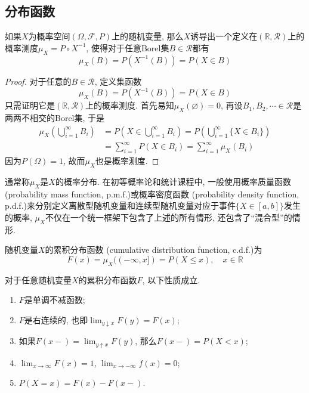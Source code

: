 \documentclass[cn, 12pt, math=mtpro2, bibstyle=apa, blue, twocol]{elegantbook}
\newcommand{\F}{\mathcal{F}}
\newcommand{\R}{\mathbb{R}}
\newcommand{\PP}{P}
\let\emptyset\varnothing
\begin{document}
\subsection{分布函数}
\begin{theorem}
  如果$X$为概率空间$(\Omega,\F,\PP)$上的随机变量, 那么$X$诱导出一个定义在$(\R,\mathcal{R})$上的概率测度$\mu_X=\PP\circ X^{-1}$, 使得对于任意Borel集$B\in\mathcal{R}$都有
  $$\mu_X(B)=\PP(X^ {-1}(B))=\PP(X\in B)$$
\end{theorem}
\begin{proof}
  对于任意的$B\in\mathcal{R}$, 定义集函数
  $$\mu_X(B)=\PP(X^{-1}(B))=\PP(X\in B)$$
  只需证明它是$(\R,\mathcal{R})$上的概率测度. 首先易知$\mu_X(\emptyset)=0$, 再设$B_1,B_2,\cdots\in\mathcal{R}$是两两不相交的Borel集, 于是
  \begin{align*}
  \mu_X\left(\bigcup_{i=1}^\infty B_i \right)&=\PP\left(X\in\bigcup_{i=1}^\infty B_i\right)=\PP\left(\bigcup_{i=1}^\infty\{X\in B_i\}\right) \\
  &=\sum_{i=1}^{\infty}\PP(X\in B_i)=\sum_{i=1}^{\infty}\mu_X(B_i)
  \end{align*}
  因为$\PP(\Omega)=1$, 故而$\mu_X$也是概率测度.
\end{proof}
通常称$\mu_X$是$X$的概率分布. 在初等概率论和统计课程中, 一般使用概率质量函数 (probability mass function, p.m.f.)或概率密度函数 (probability density function, p.d.f.)来分别定义离散型随机变量和连续型随机变量对应于事件$\{X\in[a,b]\}$发生的概率, $\mu_X$不仅在一个统一框架下包含了上述的所有情形, 还包含了“混合型”的情形.
\begin{definition}
随机变量$X$的累积分布函数 (cumulative distribution function, c.d.f.)为
$$F(x)=\mu_X((-\infty,x])=\PP(X\leq x),\quad x\in\R$$
\end{definition}
\begin{theorem}\label{thm:thm1.10}
  对于任意随机变量$X$的累积分布函数$F$, 以下性质成立.
  \begin{enumerate}[label=(\arabic*)]
    \item $F$是单调不减函数;
    \item $F$是右连续的, 也即$\lim_{y\downarrow x}F(y)=F(x)$;
    \item 如果$F(x-)=\lim_{y\uparrow x}F(y)$, 那么$F(x-)=\PP(X<x)$;
    \item $ \lim_{x\to\infty} F(x)=1$, $\lim_{x\to-\infty}f(x)=0$;
    \item $\PP(X=x)=F(x)-F(x-)$.
  \end{enumerate}
\end{theorem}
\end{document}
